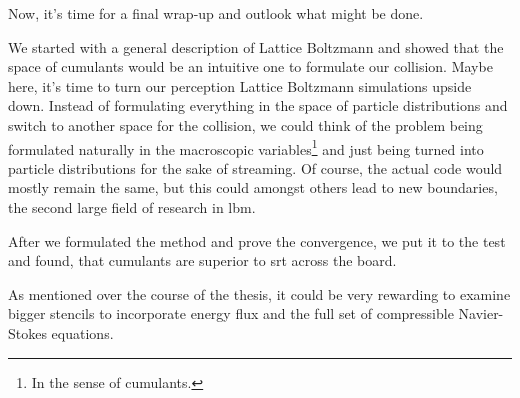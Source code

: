 
Now, it's time for a final wrap-up and outlook what might be done.

We started with a general description of Lattice Boltzmann and showed that the space of cumulants would be an intuitive one to formulate our collision.
Maybe here, it's time to turn our perception Lattice Boltzmann simulations upside down.
Instead of formulating everything in the space of particle distributions and switch to another space for the collision, we could think of the problem being formulated naturally in the macroscopic variables\footnote{In the sense of cumulants.} and just being turned into particle distributions for the sake of streaming.
Of course, the actual code would mostly remain the same, but this could amongst others lead to new boundaries, the second large field of research in \gls{lbm}.

After we formulated the method and prove the convergence, we put it to the test and found, that cumulants are superior to \gls{srt} across the board.

As mentioned over the course of the thesis, it could be very rewarding to examine bigger stencils to incorporate energy flux and the full set of compressible Navier-Stokes equations.
